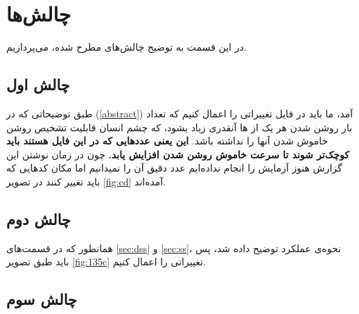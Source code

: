 \documentclass[dvipsnames, svgnames, x11names, a4paper, 11pt]{article}
\begin{document}
\section{چالش‌ها}
در این قسمت به توضیح چالش‌های مطرح شده، می‌پردازیم.

\subsection{چالش اول}
طبق توضیحاتی که در 
(\ref{abstract})
آمد، ما باید در فایل 
تغییراتی را اعمال کنیم که تعداد بار روشن شدن هر یک از 
ها
آنقدری زیاد بشود، که چشم انسان قابلیت تشخیص روشن خاموش شدن آنها را نداشته باشد.
\textbf{این یعنی عدد‌هایی که در این فایل‌ هستند باید کوچک‌تر شوند تا سرعت خاموش روشن شدن افزایش یابد.}
چون در زمان نوشتن این گزارش هنوز آزمایش را انجام نداده‌ایم عدد دقیق آن را نمیدانیم اما مکان‌ کد‌هایی که باید تغییر کنند در تصویر
\ref{fig:cd}
آمده‌اند.
\subsection{چالش دوم}
همانطور که در قسمت‌های
\ref{sec:dss}
و
\ref{sec:ss}،
نحوه‌ی عملکرد توضیح داده شد، پس باید طبق تصویر 
\ref{fig:135c}
تغییراتی را اعمال کنیم. 
\subsection{چالش سوم}

\begin{figure}[b]
\begin{center}
\hspace{3mm}
\end{center}
\end{figure}
\listoffigures
\end{document}
